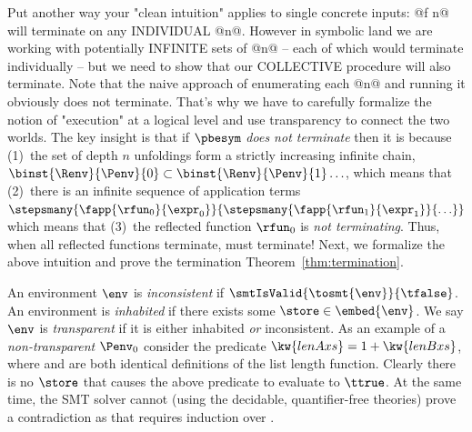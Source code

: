 %
%
Put another way your "clean intuition" applies to
single concrete inputs: @f n@ will terminate on any
INDIVIDUAL @n@. However in symbolic land we are working
with potentially INFINITE sets of @n@ -- each of which
would terminate individually -- but we need to show
that our COLLECTIVE procedure will also terminate.
%
Note that the naive approach of enumerating each @n@
and running it obviously does not terminate.
That's why we have to carefully formalize
the notion of "execution" at a logical level
and use transparency to connect the two worlds.
%
The key insight is that if $\pbesym$ \emph{does not terminate}
then it is because
%
(1)~the set of depth $n$ unfoldings form a strictly
    increasing infinite chain,
    $\binst{\Renv}{\Penv}{0} \subset \binst{\Renv}{\Penv}{1} \ldots$,
    which means that
(2)~there is an infinite sequence of application terms
    $\stepsmany{\fapp{\rfun_0}{\expr_0}}{\stepsmany{\fapp{\rfun_1}{\expr_1}}{\ldots}}$
    which means that
(3)~the reflected function $\rfun_0$ is \emph{not terminating}.
%
Thus, when all reflected functions terminate, \pbesym must terminate!
%
Next, we formalize the above intuition and
prove the termination Theorem~\ref{thm:termination}.

%
An environment $\env$ is \emph{inconsistent}
if $\smtIsValid{\tosmt{\env}}{\tfalse}$.
%
An environment \env is \emph{inhabited}
if there exists some $\store \in \embed{\env}$.
%
We say $\env$ is \emph{transparent}
if it is either inhabited \emph{or} inconsistent.
%
As an example of a \emph{non-transparent}
$\Penv_0$ consider the predicate
$\kw{lenA xs} = 1 + \kw{lenB xs}$,
where  and  are both
identical definitions of the list length
function.
%
Clearly there is no $\store$ that causes
the above predicate to evaluate to $\ttrue$.
%
At the same time, the SMT solver cannot
(using the decidable, quantifier-free theories)
prove a contradiction as that requires
induction over .

